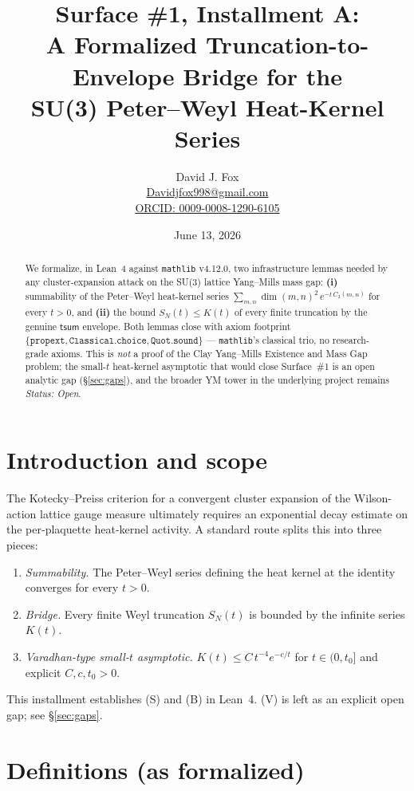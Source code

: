 \documentclass{article}
\title{Surface \#1, Installment A:\\
A Formalized Truncation-to-Envelope Bridge for the\\
SU(3) Peter--Weyl Heat-Kernel Series}
\author{David J. Fox \\
\href{mailto:Davidjfox998@gmail.com}{Davidjfox998@gmail.com} \\
\href{https://orcid.org/0009-0008-1290-6105}{ORCID: 0009-0008-1290-6105}}
\date{June 13, 2026}
\begin{document}
\maketitle

\begin{abstract}
We formalize, in Lean~4 against \texttt{mathlib} v4.12.0, two
infrastructure lemmas needed by any cluster-expansion attack on the
SU(3) lattice Yang--Mills mass gap:
\textbf{(i)} summability of the Peter--Weyl heat-kernel series
$\sum_{m,n} \dim(m,n)^2\, e^{-t\,C_2(m,n)}$ for every $t>0$, and
\textbf{(ii)} the bound $S_N(t) \le K(t)$ of every finite truncation
by the genuine $\mathsf{tsum}$ envelope. Both lemmas close with
axiom footprint $\{\texttt{propext}, \texttt{Classical.choice},
\texttt{Quot.sound}\}$ --- \texttt{mathlib}'s classical trio, no
research-grade axioms. This is \emph{not} a proof of the
Clay Yang--Mills Existence and Mass Gap problem; the small-$t$
heat-kernel asymptotic that would close Surface~\#1 is an open
analytic gap (\S\ref{sec:gaps}), and the broader YM tower in the
underlying project remains \emph{Status: Open}.
\end{abstract}

\section{Introduction and scope}

The Kotecky--Preiss criterion for a convergent cluster expansion of
the Wilson-action lattice gauge measure ultimately requires an
exponential decay estimate on the per-plaquette heat-kernel activity.
A standard route splits this into three pieces:
\begin{enumerate}
  \item[(S)] \emph{Summability.} The Peter--Weyl series defining the
        heat kernel at the identity converges for every $t>0$.
  \item[(B)] \emph{Bridge.} Every finite Weyl truncation $S_N(t)$ is
        bounded by the infinite series $K(t)$.
  \item[(V)] \emph{Varadhan-type small-$t$ asymptotic.}
        $K(t) \le C\,t^{-4} e^{-c/t}$ for $t \in (0,t_0]$ and
        explicit $C, c, t_0 > 0$.
\end{enumerate}
This installment establishes (S) and (B) in Lean~4. (V) is left as
an explicit open gap; see \S\ref{sec:gaps}.

\section{Definitions (as formalized)}
\end{document}
